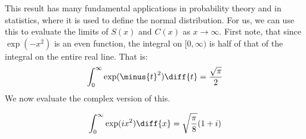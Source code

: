         This result has many fundamental applications in
        probability theory and in statistics, where
        it is used to define the normal distribution.
        For us, we can use this to evaluate the limits of
        $S(x)$ and $C(x)$ as $x\rightarrow\infty$.
        First note, that since $\exp(-x^{2})$ is an even
        function, the integral on $[0,\infty)$ is half of
        that of the integral on the entire real line. That is:
        \begin{equation}
            \int_{0}^{\infty}\exp(\minus{t}^{2})\diff{t}
            =\frac{\sqrt{\pi}}{2}
        \end{equation}
        We now evaluate the complex version of this.
        \begin{theorem}
            \begin{equation}
                \int_{0}^{\infty}\exp(ix^{2})\diff{x}
                =\sqrt{\frac{\pi}{8}}(1+i)
            \end{equation}
        \end{theorem}
